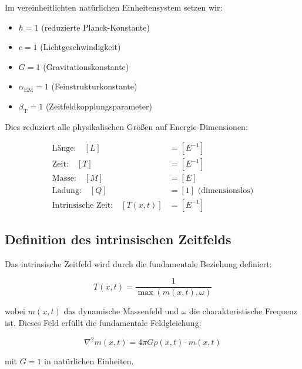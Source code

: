 \documentclass[12pt,a4paper]{article}
\newcommand{\Tfieldt}{T(x,t)}
\newcommand{\alphaEM}{\alpha_{\text{EM}}}
\newcommand{\betaT}{\beta_{\text{T}}}
\begin{document}
	Im vereinheitlichten natürlichen Einheitensystem setzen wir:
	\begin{itemize}
		\item $\hbar = 1$ (reduzierte Planck-Konstante)
		\item $c = 1$ (Lichtgeschwindigkeit)
		\item $G = 1$ (Gravitationskonstante)
		\item $\alphaEM = 1$ (Feinstrukturkonstante)
		\item $\betaT = 1$ (Zeitfeldkopplungsparameter)
	\end{itemize}
	
	Dies reduziert alle physikalischen Größen auf Energie-Dimensionen:
	
	\begin{tcolorbox}[colback=blue!5!white,colframe=blue!75!black,title=Dimensionsstruktur vereinheitlichter natürlicher Einheiten]
		\begin{align}
			\text{Länge:} \quad [L] &= [E^{-1}] \\
			\text{Zeit:} \quad [T] &= [E^{-1}] \\
			\text{Masse:} \quad [M] &= [E] \\
			\text{Ladung:} \quad [Q] &= [1] \text{ (dimensionslos)} \\
			\text{Intrinsische Zeit:} \quad [\Tfieldt] &= [E^{-1}]
		\end{align}
	\end{tcolorbox}
	
	\subsection{Definition des intrinsischen Zeitfelds}
	\label{subsec:time_field_definition}
	
	Das intrinsische Zeitfeld wird durch die fundamentale Beziehung definiert:
	
	\begin{equation}
		\Tfieldt = \frac{1}{\max(m(x,t), \omega)}
	\end{equation}
	
	wobei $m(x,t)$ das dynamische Massenfeld und $\omega$ die charakteristische Frequenz ist. Dieses Feld erfüllt die fundamentale Feldgleichung:
	
	\begin{equation}
		\nabla^2 m(x,t) = 4\pi G \rho(x,t) \cdot m(x,t)
	\end{equation}
	
	mit $G = 1$ in natürlichen Einheiten.
	
\end{document}
